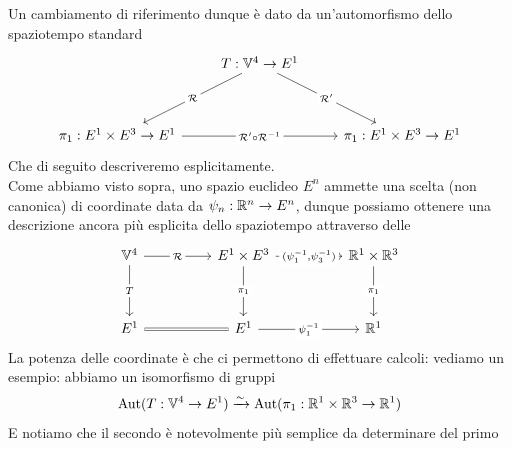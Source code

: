 \documentclass[openany]{book}
\renewcommand\V{\mathbb{V}}
\begin{document}
Un cambiamento di riferimento dunque è dato da un'automorfismo dello spaziotempo standard
\[\begin{tikzcd}
	& {T:\V^4\to E^1} & \\
	\\
	{\pi_1:E^1\times E^3 \to E^1} && {\pi_1: E^1 \times E^3\to E^1}
	\arrow["{\mc R}"{description}, from=1-2, to=3-1]
	\arrow["{\mc R'}"{description}, from=1-2, to=3-3]
	\arrow["{\mc R' \circ \mc R^{-1}}"{description}, from=3-1, to=3-3]
\end{tikzcd}\]
Che di seguito descriveremo esplicitamente.\\
Come abbiamo visto sopra, uno spazio euclideo $E^n$ ammette una scelta (non canonica) di coordinate data da $\psi_n:\mathbb{R}^n\to E^n$, dunque possiamo ottenere una descrizione ancora più esplicita dello spaziotempo attraverso delle 
\[\begin{tikzcd}
	{\V^4} && {E^1\times E^3} && {\R^1\times \R^3} \\
	\\
	{E^1} && {E^1} && {\R^1}
	\arrow["{\mc R}"{description}, from=1-1, to=1-3]
	\arrow["T"{description}, from=1-1, to=3-1]
	\arrow["{(\psi_1^{-1},\psi_3^{-1})}"{description}, from=1-3, to=1-5]
	\arrow["{\pi_1}"{description}, from=1-3, to=3-3]
	\arrow["{\pi_1}"{description}, from=1-5, to=3-5]
	\arrow[equals, from=3-1, to=3-3]
	\arrow["{\psi_1^{-1}}"{description}, from=3-3, to=3-5]
\end{tikzcd}\]
La potenza delle coordinate è che ci permettono di effettuare calcoli: vediamo un esempio:  abbiamo un isomorfismo di gruppi
\[ \Aut(T:\V^4\to E^1) \iso \Aut(\pi_1:\R^1\times\R^3\to\R^1 ) \]
E notiamo che il secondo è notevolmente più semplice da determinare del primo
\end{document}
